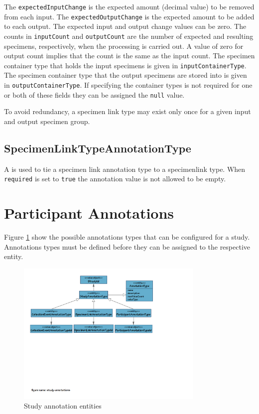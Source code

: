The \texttt{expectedInputChange} is the expected amount (decimal value) to be
removed from each input. The \texttt{expectedOutputChange} is the expected
amount to be added to each output. The expected input and output change values
can be zero.  The counts in \texttt{inputCount} and \texttt{outputCount} are
the number of expected and resulting specimens, respectively, when the
processing is carried out. A value of zero for output count implies that the
count is the same as the input count. The specimen container type that holds
the input specimens is given in \texttt{inputContainerType}. The specimen
container type that the output specimens are stored into is given in
\texttt{outputContainerType}. If specifying the container types is not required
for one or both of these fields they can be assigned the \texttt{null} value.

To avoid redundancy, a specimen link type may exist only once for a given input
and output specimen group.

\subsection*{SpecimenLinkTypeAnnotationType}

A  is used to tie a specimen
link annotation type to a specimenlink type. When \texttt{required} is set to
\texttt{true} the annotation value is not allowed to be empty.

\section{Participant Annotations}
\label{sec:participant-annotations}

Figure \ref{fig:study-annotations} show the possible annotations types that can
be configured for a study. Annotations types must be defined before they can be
assigned to the respective entity.

\begin{figure}[H]
  \centering
  \includegraphics[trim={9mm 108mm 64mm 9mm}, clip,
    width=0.8\textwidth]{images/study-annotations}
  \caption{Study annotation entities}
  \label{fig:study-annotations}
\end{figure}


